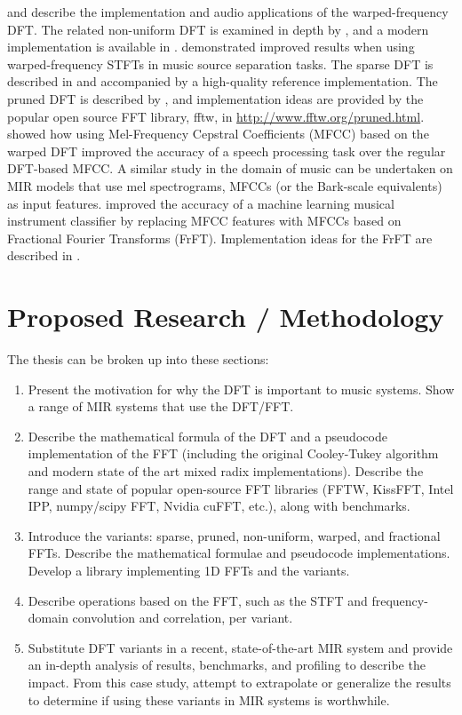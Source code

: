 \documentclass[letter,12pt]{scrartcl}
\begin{document}
\citet{warped1} and \citet{warped2} describe the implementation and audio applications of the warped-frequency DFT. The related non-uniform DFT is examined in depth by \citet{nufft1}, and a modern implementation is available in \citet{nufft2}. \citet{betterbss} demonstrated improved results when using warped-frequency STFTs in music source separation tasks. The sparse DFT is described in \citet{sparse} and accompanied by a high-quality reference implementation. The pruned DFT is described by \citet{pruned}, and implementation ideas are provided by the popular open source FFT library, fftw, in \href{http://www.fftw.org/pruned.html}{http://www.fftw.org/pruned.html}.\\

\citet{bettermfcc} showed how using Mel-Frequency Cepstral Coefficients (MFCC) based on the warped DFT improved the accuracy of a speech processing task over the regular DFT-based MFCC. A similar study in the domain of music can be undertaken on MIR models that use mel spectrograms, MFCCs (or the Bark-scale equivalents) as input features. \citet{fractional1} improved the accuracy of a machine learning musical instrument classifier by replacing MFCC features with MFCCs based on Fractional Fourier Transforms (FrFT). Implementation ideas for the FrFT are described in \citet{fractional2}.


\section{Proposed Research / Methodology}

The thesis can be broken up into these sections:
\begin{enumerate}
	\item
		Present the motivation for why the DFT is important to music systems. Show a range of MIR systems that use the DFT/FFT.
	\item
		Describe the mathematical formula of the DFT and a pseudocode implementation of the FFT (including the original Cooley-Tukey algorithm and modern state of the art mixed radix implementations). Describe the range and state of popular open-source FFT libraries (FFTW, KissFFT, Intel IPP, numpy/scipy FFT, Nvidia cuFFT, etc.), along with benchmarks.
	\item
		Introduce the variants: sparse, pruned, non-uniform, warped, and fractional FFTs. Describe the mathematical formulae and pseudocode implementations. Develop a library implementing 1D FFTs and the variants.
	\item
		Describe operations based on the FFT, such as the STFT and frequency-domain convolution and correlation, per variant.
	\item
		Substitute DFT variants in a recent, state-of-the-art MIR system and provide an in-depth analysis of results, benchmarks, and profiling to describe the impact. From this case study, attempt to extrapolate or generalize the results to determine if using these variants in MIR systems is worthwhile.
\end{enumerate}
\end{document}
